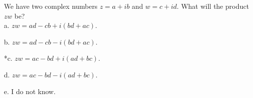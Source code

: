 
We have two complex numbers \(z = a+ib\) and
\(w = c+id\). What will the product \(zw\) be?\\

a. \(zw = ad - cb + i(bd + ac)\).

b. \(zw = ad - cb - i(bd + ac)\).

*c. \(zw = ac - bd + i(ad + bc)\).

d. \(zw = ac - bd - i(ad + bc)\).

e. I do not know.\\
